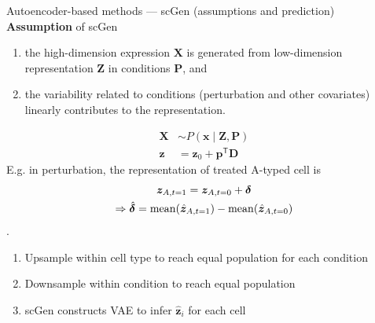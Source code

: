 \documentclass[10pt]{beamer}
\begin{document}
\begin{frame}{Autoencoder-based methods --- \normalsize scGen (assumptions and prediction)}
    \textbf{Assumption} of scGen\cite{lotfollahi_scgen_2019}
    \begin{enumerate}
        \item the high-dimension expression $\bm{X}$ is generated from low-dimension representation $\bm{Z}$ in conditions $\bm{P}$, and
        \item the variability related to conditions (perturbation and other covariates) linearly contributes to the representation.
    \end{enumerate}
    \begin{align}
        \bm{X} & \sim P(\bm{x}\mid \bm{Z}, \bm{P}) \label{eq:scgenvae}\\
        \bm{z} & = \bm{z}_0 + \bm{p}^\mathsf{T}\mathbf{D}
    \end{align}
    E.g. in perturbation, the representation of treated A-typed cell is 
    \begin{gather}
        \bm{z}_{A,t=1} = \bm{z}_{A,t=0} + \bm{\delta}\\
        \Rightarrow\hat{\bm{\delta}} = \operatorname*{mean}(\hat{\bm{z}}_{A,t=1})-\operatorname*{mean}(\hat{\bm{z}}_{A,t=0})
    \end{gather}.
    \begin{enumerate}
        \item Upsample within cell type to reach equal population for each condition
        \item Downsample within condition to reach equal population
        \item scGen constructs VAE to infer $\hat{\bm{z}}_i$ for each cell
    \end{enumerate}
\end{frame}
\end{document}
